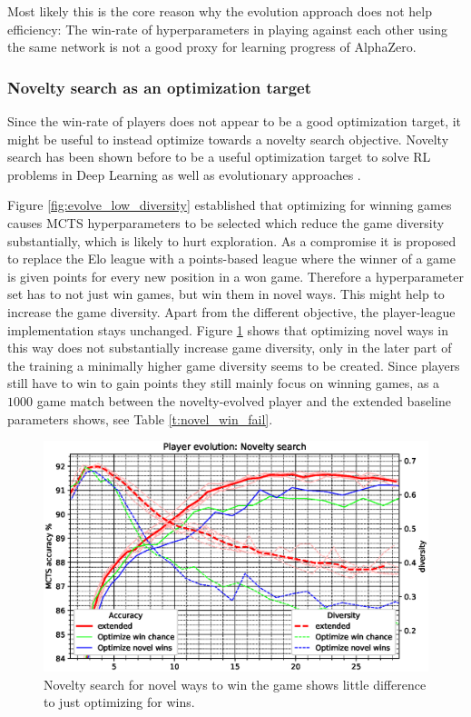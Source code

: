 \documentclass[12pt,onecolumn,oneside,titlepage]{article}
\begin{document}
Most likely this is the core reason why the evolution approach does not help efficiency: The win-rate of hyperparameters in playing against each other using the same network is not a good proxy for learning progress of AlphaZero.


\subsubsection{Novelty search as an optimization target}

Since the win-rate of players does not appear to be a good optimization target, it might be useful to instead optimize towards a novelty search objective. Novelty search has been shown before to be a useful optimization target to solve RL problems in Deep Learning as well
as evolutionary approaches \cite{lehman2011abandoning, jackson2019novelty}.

Figure \ref{fig:evolve_low_diversity} established that optimizing for winning games causes MCTS hyperparameters to be selected which reduce the game diversity substantially, which is likely to hurt exploration.
As a compromise it is proposed to replace the Elo league with a points-based league where the winner of a game is given points for every new position in a won game. Therefore a hyperparameter set has to not just win games, but win them in novel ways.
This might help to increase the game diversity. Apart from the different objective, the player-league implementation stays unchanged. Figure \ref{fig:player_evolution_win_novelty} shows that optimizing novel ways in this way does
not substantially increase game diversity, only in the later part of the training a minimally higher game diversity seems to be created. Since players still have to win to gain points they still mainly focus on winning games, as a $1000$ game match between the novelty-evolved player
and the extended baseline parameters shows, see Table \ref{t:novel_win_fail}.

\begin{figure}[H]
\centering
\includegraphics[clip,width=\columnwidth]{player_evolution_win_novelty}
\caption{Novelty search for novel ways to win the game shows little difference to just optimizing for wins.}
\label{fig:player_evolution_win_novelty}
\end{figure}
\end{document}
